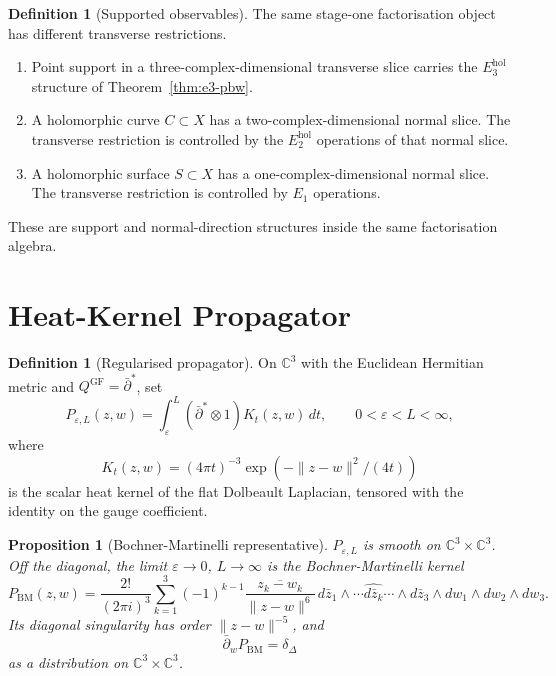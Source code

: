 \documentclass[11pt]{article}
\providecommand{\C}{\mathbb{C}}
\providecommand{\dbar}{\bar{\partial}}
\providecommand{\dbarstar}{\bar{\partial}^{\ast}}
\theoremstyle{plain}
\newtheorem{proposition}[theorem]{Proposition}
\theoremstyle{definition}
\newtheorem{definition}[theorem]{Definition}
\theoremstyle{remark}
\begin{document}
\begin{definition}[Supported observables]
\label{def:supported-observables}
The same stage-one factorisation object has different transverse
restrictions.
\begin{enumerate}
\item Point support in a three-complex-dimensional transverse slice
carries the \(E_3^{\mathrm{hol}}\) structure of
Theorem~\ref{thm:e3-pbw}.
\item A holomorphic curve \(C\subset X\) has a two-complex-dimensional
normal slice. The transverse restriction is controlled by the
\(E_2^{\mathrm{hol}}\) operations of that normal slice.
\item A holomorphic surface \(S\subset X\) has a one-complex-dimensional
normal slice. The transverse restriction is controlled by \(E_1\)
operations.
\end{enumerate}
These are support and normal-direction structures inside the same
factorisation algebra.
\end{definition}

\section{Heat-Kernel Propagator}
\label{sec:propagator}

\begin{definition}[Regularised propagator]
\label{def:propagator}
On \(\C^3\) with the Euclidean Hermitian metric and
\(Q^{\mathrm{GF}}=\dbarstar\), set
\[
  P_{\varepsilon,L}(z,w)
  =
  \int_\varepsilon^L(\dbarstar\otimes 1)K_t(z,w)\,dt,
  \qquad
  0<\varepsilon<L<\infty ,
\]
where
\[
  K_t(z,w)=(4\pi t)^{-3}\exp(-\|z-w\|^2/(4t))
\]
is the scalar heat kernel of the flat Dolbeault Laplacian, tensored
with the identity on the gauge coefficient.
\end{definition}

\begin{proposition}[Bochner-Martinelli representative]
\label{prop:bm}
\(P_{\varepsilon,L}\) is smooth on \(\C^3\times\C^3\). Off the
diagonal, the limit \(\varepsilon\to0\), \(L\to\infty\) is the
Bochner-Martinelli kernel
\[
  P_{\mathrm{BM}}(z,w)
  =
  \frac{2!}{(2\pi i)^3}
  \sum_{k=1}^{3}(-1)^{k-1}
  \frac{\overline{z_k-w_k}}{\|z-w\|^6}\,
  d\bar z_1\wedge\cdots\widehat{d\bar z_k}\cdots\wedge d\bar z_3
  \wedge dw_1\wedge dw_2\wedge dw_3.
\]
Its diagonal singularity has order \(\|z-w\|^{-5}\), and
\[
  \dbar_wP_{\mathrm{BM}}=\delta_\Delta
\]
as a distribution on \(\C^3\times\C^3\).
\end{proposition}
\end{document}
